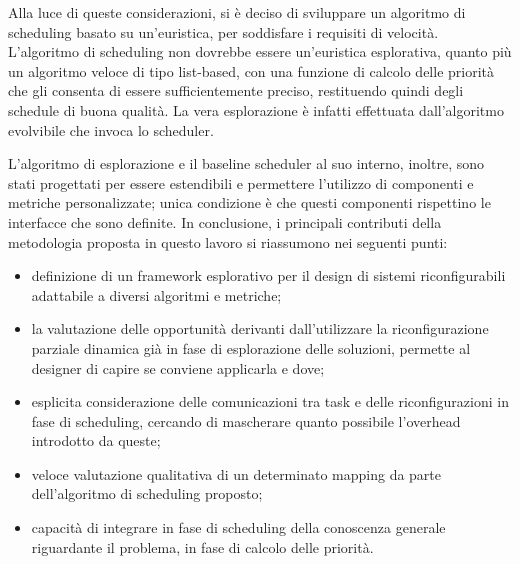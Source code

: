 Alla luce di queste considerazioni, si è deciso di sviluppare un algoritmo di scheduling basato su
un'euristica, per soddisfare i requisiti di velocità. L'algoritmo di scheduling non
dovrebbe essere un'euristica esplorativa, quanto più un algoritmo veloce di tipo list-based,
con una funzione di calcolo delle priorità che gli consenta di essere sufficientemente preciso,
restituendo quindi degli schedule di buona qualità.
La vera esplorazione \`e infatti effettuata dall'algoritmo evolvibile che invoca lo scheduler.

L'algoritmo di esplorazione e il baseline scheduler al suo interno, inoltre, sono stati progettati
per essere estendibili e permettere l'utilizzo di componenti e metriche personalizzate; unica condizione
\`e che questi componenti rispettino le interfacce che sono definite.
In conclusione, i principali contributi della metodologia proposta in questo lavoro
si riassumono nei seguenti punti:
\begin{itemize}
  \item definizione di un framework esplorativo per il design di sistemi riconfigurabili adattabile
    a diversi algoritmi e metriche;
  \item la valutazione delle opportunit\`a derivanti dall'utilizzare la riconfigurazione parziale dinamica gi\`a
    in fase di esplorazione delle soluzioni, permette al designer di capire se conviene applicarla e dove;
  \item esplicita considerazione delle comunicazioni tra task e delle riconfigurazioni in fase di scheduling,
    cercando di mascherare quanto possibile l'overhead introdotto da queste;
  \item veloce valutazione qualitativa di un determinato mapping da parte dell'algoritmo di scheduling proposto;
  \item capacit\`a di integrare in fase di scheduling della conoscenza generale riguardante
    il problema, in fase di calcolo delle priorit\`a.
\end{itemize}
